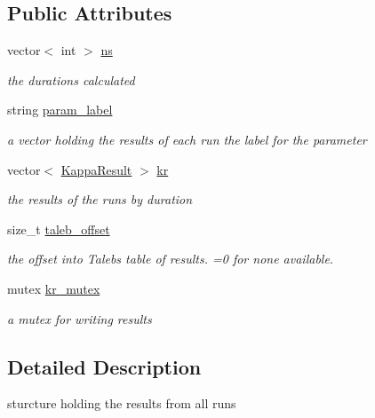 \subsection*{Public Attributes}
\begin{DoxyCompactItemize}
\item 
vector$<$ int $>$ \mbox{\hyperlink{structKappaResults_a4e6a25c186ed54790616474d54a618c3}{ns}}
\begin{DoxyCompactList}\small\item\em the durations calculated \end{DoxyCompactList}\item 
string \mbox{\hyperlink{structKappaResults_a2b42189a3b7690aedacd6d77c05a1c5b}{param\+\_\+label}}
\begin{DoxyCompactList}\small\item\em a vector holding the results of each run the label for the parameter \end{DoxyCompactList}\item 
\mbox{\label{structKappaResults_a2988f98b9b5b70ec1e3ac16e41c57ea2}} 
vector$<$ \mbox{\hyperlink{structKappaResult}{Kappa\+Result}} $>$ \mbox{\hyperlink{structKappaResults_a2988f98b9b5b70ec1e3ac16e41c57ea2}{kr}}
\begin{DoxyCompactList}\small\item\em the results of the runs by duration \end{DoxyCompactList}\item 
size\+\_\+t \mbox{\hyperlink{structKappaResults_a133dbed775f98f56566b9571ff05746d}{taleb\+\_\+offset}}
\begin{DoxyCompactList}\small\item\em the offset into Taleb\textquotesingle{}s table of results. =0 for none available. \end{DoxyCompactList}\item 
\mbox{\label{structKappaResults_a9a2244648ae6ffb1d966bdc414d25240}} 
mutex \mbox{\hyperlink{structKappaResults_a9a2244648ae6ffb1d966bdc414d25240}{kr\+\_\+mutex}}
\begin{DoxyCompactList}\small\item\em a mutex for writing results \end{DoxyCompactList}\end{DoxyCompactItemize}


\subsection{Detailed Description}
sturcture holding the results from all runs 

